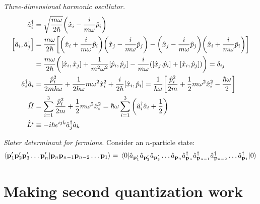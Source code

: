 \documentclass{report}
\begin{document}
\begin{subquests}
	\item \emph{Three-dimensional harmonic oscillator.}
	\begin{align*}
		\hat{a}_i^{\dagger} & = \sqrt{\frac{m\omega}{2\hbar}}\pqty{\hat{x}_i - \frac{i}{m\omega}\hat{p}_i} \\
		\bqty{\hat{a}_i,\hat{a}_j^{\dagger}} & = \frac{m\omega}{2\hbar}\bqty{\pqty{\hat{x}_i + \frac{i}{m\omega}\hat{p}_i}\pqty{\hat{x}_j - \frac{i}{m\omega}\hat{p}_j} - \pqty{\hat{x}_j - \frac{i}{m\omega}\hat{p}_j}\pqty{\hat{x}_i + \frac{i}{m\omega}\hat{p}_i}} \\
		& = \frac{m\omega}{2\hbar}\pqty{\bqty{\hat{x}_i,\hat{x}_j} + \frac{1}{m^2\omega^2}\bqty{\hat{p}_i,\hat{p}_j} - \frac{i}{m\omega}\pqty{\bqty{\hat{x}_j.\hat{p}_i} + \bqty{\hat{x}_i,\hat{p}_j}}} = \delta_{ij} \\
		\hat{a}_i^{\dagger}\hat{a}_i & = \frac{\hat{p}_i^2}{2m\hbar\omega} + \frac{1}{2\hbar\omega}m\omega^2\hat{x}_i^2 + \frac{i}{2\hbar}\bqty{\hat{x}_i, \hat{p}_i } = \frac{1}{\hbar\omega}\bqty{\frac{\hat{p}_i^2}{2m} + \frac{1}{2}m\omega^2\hat{x}_i^2 - \frac{\hbar\omega}{2}} \\
		\hat{H} & = \sum_{i=1}^3\frac{\hat{p}_i^2}{2m} + \frac{1}{2}m\omega^2\hat{x}_i^2 = \hbar\omega \sum_{i=1}^3 \pqty{\hat{a}_i^{\dagger} \hat{a}_i + \frac{1}{2}} \\
		\hat{L}^i & \equiv -i\hbar\epsilon^{ijk}\hat{a}^{\dagger}_j\hat{a}_k		
	\end{align*}

	\item \emph{Slater determinant for fermions.} Consider an $n$-particle state:
	\begin{gather*}
		\braket{\vb{p}'_1 \vb{p}'_2 \vb{p}'_3\dots \vb{p}'_n}{\vb{p}_n \vb{p}_{n-1} \vb{p}_{n-2} \dots \vb{p}_1} = \mel{0}{\hat{a}_{\vb p'_1}\hat{a}_{\vb p'_2} \hat{a}_{\vb p'_3} \dots \hat{a}_{\vb p_n} \hat{a}^{\dagger}_{\vb p_n} \hat{a}^{\dagger}_{\vb p_{n-1}} \hat{a}^{\dagger}_{\vb p_{n-2}}\dots \hat{a}^{\dagger}_{\vb p_1}}{0} 
	\end{gather*}
\end{subquests}


\chapter{Making second quantization work}
\end{document}
